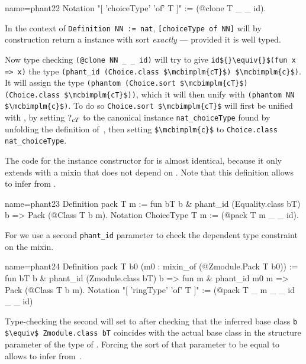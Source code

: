 \begin{coq}{name=phant22}{}
Notation "[ 'choiceType' 'of' T ]" := (@clone T _ _ id).
\end{coq}

In the context of \lstinline/Definition NN := nat/,
\lstinline/[choiceType of NN]/ will by construction return a 
instance with sort \emph{exactly}  --- provided it is well typed.

Now type checking
\lstinline/(@clone NN _ _ id)/ will try to give
\lstinline/id${}\equiv{}$(fun x => x)/ the type
\lstinline/(phant_id (Choice.class $\mcbimplm{cT}$) $\mcbimplm{c}$)/.
It will assign  the type
\lstinline/(phantom (Choice.sort $\mcbimplm{cT}$) (Choice.class $\mcbimplm{cT}$))/,
which it will then unify with \lstinline/(phantom NN $\mcbimplm{c}$)/.
To do so \lstinline/Choice.sort $\mcbimplm{cT}$/
will first be unified with ,
by setting $\mbox{?}_{cT}$ to the canonical instance
\lstinline/nat_choiceType/ found by unfolding the definition of~,
then setting \lstinline/$\mcbimplm{c}$/
to \lstinline/Choice.class nat_choiceType/.

The code for the instance constructor for  is almost
identical, because it only extends  with a mixin that does
not depend on .
Note that this definition allows \Coq{} to infer  from .

\begin{coq}{name=phant23}{}
Definition pack T m :=
  fun bT b & phant_id (Equality.class bT) b => Pack (@Class T b m).
Notation ChoiceType T m := (@pack T m _ _ id).
\end{coq}

For  we use a second \lstinline/phant_id/  parameter
to check the dependent type constraint on the mixin.

\begin{coq}{name=phant24}{}
Definition pack T b0 (m0 : mixin_of (@Zmodule.Pack T b0)) :=
  fun bT b & phant_id (Zmodule.class bT) b =>
  fun    m & phant_id m0 m => Pack (@Class T b m).
Notation "[ 'ringType' 'of' T ]" := (@pack T _ m _ _ id _ _ id)
\end{coq}

Type-checking the second  will set  to  after
checking that the inferred base class \lstinline/b $\equiv$ Zmodule.class bT/
coincides with the actual base class  in the structure parameter
of the type of .  Forcing the sort of that parameter to be equal
to  allows \Coq{} to infer  from~.

